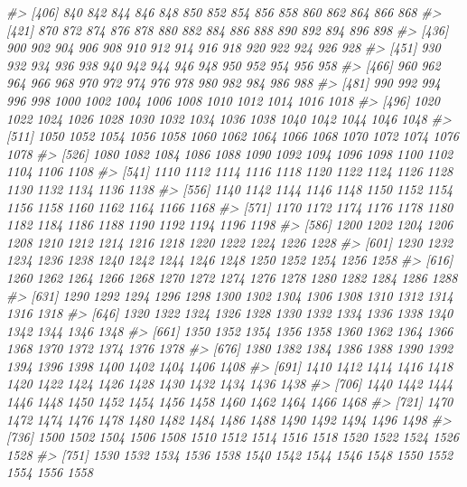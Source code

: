 \documentclass[
]{article}
\newenvironment{Shaded}{\begin{snugshade}}{\end{snugshade}}
\newcommand{\CommentTok}[1]{\textcolor[rgb]{0.56,0.35,0.01}{\textit{#1}}}
\begin{document}
\begin{Shaded}
\begin{Highlighting}[]
\CommentTok{\#\textgreater{} [406]  840  842  844  846  848  850  852  854  856  858  860  862  864  866  868}
\CommentTok{\#\textgreater{} [421]  870  872  874  876  878  880  882  884  886  888  890  892  894  896  898}
\CommentTok{\#\textgreater{} [436]  900  902  904  906  908  910  912  914  916  918  920  922  924  926  928}
\CommentTok{\#\textgreater{} [451]  930  932  934  936  938  940  942  944  946  948  950  952  954  956  958}
\CommentTok{\#\textgreater{} [466]  960  962  964  966  968  970  972  974  976  978  980  982  984  986  988}
\CommentTok{\#\textgreater{} [481]  990  992  994  996  998 1000 1002 1004 1006 1008 1010 1012 1014 1016 1018}
\CommentTok{\#\textgreater{} [496] 1020 1022 1024 1026 1028 1030 1032 1034 1036 1038 1040 1042 1044 1046 1048}
\CommentTok{\#\textgreater{} [511] 1050 1052 1054 1056 1058 1060 1062 1064 1066 1068 1070 1072 1074 1076 1078}
\CommentTok{\#\textgreater{} [526] 1080 1082 1084 1086 1088 1090 1092 1094 1096 1098 1100 1102 1104 1106 1108}
\CommentTok{\#\textgreater{} [541] 1110 1112 1114 1116 1118 1120 1122 1124 1126 1128 1130 1132 1134 1136 1138}
\CommentTok{\#\textgreater{} [556] 1140 1142 1144 1146 1148 1150 1152 1154 1156 1158 1160 1162 1164 1166 1168}
\CommentTok{\#\textgreater{} [571] 1170 1172 1174 1176 1178 1180 1182 1184 1186 1188 1190 1192 1194 1196 1198}
\CommentTok{\#\textgreater{} [586] 1200 1202 1204 1206 1208 1210 1212 1214 1216 1218 1220 1222 1224 1226 1228}
\CommentTok{\#\textgreater{} [601] 1230 1232 1234 1236 1238 1240 1242 1244 1246 1248 1250 1252 1254 1256 1258}
\CommentTok{\#\textgreater{} [616] 1260 1262 1264 1266 1268 1270 1272 1274 1276 1278 1280 1282 1284 1286 1288}
\CommentTok{\#\textgreater{} [631] 1290 1292 1294 1296 1298 1300 1302 1304 1306 1308 1310 1312 1314 1316 1318}
\CommentTok{\#\textgreater{} [646] 1320 1322 1324 1326 1328 1330 1332 1334 1336 1338 1340 1342 1344 1346 1348}
\CommentTok{\#\textgreater{} [661] 1350 1352 1354 1356 1358 1360 1362 1364 1366 1368 1370 1372 1374 1376 1378}
\CommentTok{\#\textgreater{} [676] 1380 1382 1384 1386 1388 1390 1392 1394 1396 1398 1400 1402 1404 1406 1408}
\CommentTok{\#\textgreater{} [691] 1410 1412 1414 1416 1418 1420 1422 1424 1426 1428 1430 1432 1434 1436 1438}
\CommentTok{\#\textgreater{} [706] 1440 1442 1444 1446 1448 1450 1452 1454 1456 1458 1460 1462 1464 1466 1468}
\CommentTok{\#\textgreater{} [721] 1470 1472 1474 1476 1478 1480 1482 1484 1486 1488 1490 1492 1494 1496 1498}
\CommentTok{\#\textgreater{} [736] 1500 1502 1504 1506 1508 1510 1512 1514 1516 1518 1520 1522 1524 1526 1528}
\CommentTok{\#\textgreater{} [751] 1530 1532 1534 1536 1538 1540 1542 1544 1546 1548 1550 1552 1554 1556 1558}

\end{Highlighting}
\end{Shaded}
\end{document}
